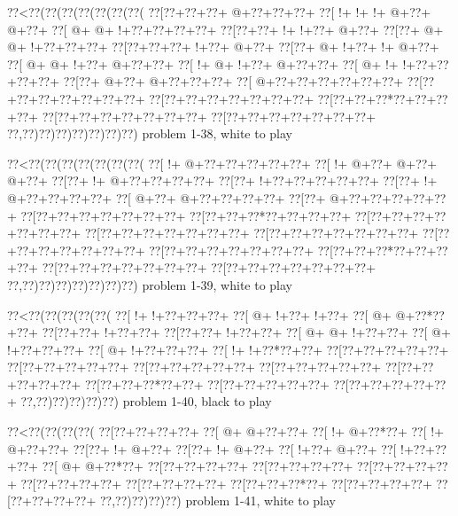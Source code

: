 \vbox{\vbox{\goo
\0??<\0??(\0??(\0??(\0??(\0??(\0??(\0??(
\0??[\0??+\0??+\0??+\- @+\0??+\0??+\0??+
\0??[\- !+\- !+\- !+\- @+\0??+\- @+\0??+
\0??[\- @+\- @+\- !+\0??+\0??+\0??+\0??+
\0??[\0??+\0??+\- !+\- !+\0??+\- @+\0??+
\0??[\0??+\- @+\- @+\- !+\0??+\0??+\0??+
\0??[\0??+\0??+\0??+\- !+\0??+\- @+\0??+
\0??[\0??+\- @+\- !+\0??+\- !+\- @+\0??+
\0??[\- @+\- @+\- !+\0??+\- @+\0??+\0??+
\0??[\- !+\- @+\- !+\0??+\- @+\0??+\0??+
\0??[\- @+\- !+\- !+\0??+\0??+\0??+\0??+
\0??[\0??+\- @+\0??+\- @+\0??+\0??+\0??+
\0??[\- @+\0??+\0??+\0??+\0??+\0??+\0??+
\0??[\0??+\0??+\0??+\0??+\0??+\0??+\0??+
\0??[\0??+\0??+\0??+\0??+\0??+\0??+\0??+
\0??[\0??+\0??+\0??*\0??+\0??+\0??+\0??+
\0??[\0??+\0??+\0??+\0??+\0??+\0??+\0??+
\0??[\0??+\0??+\0??+\0??+\0??+\0??+\0??+
\0??,\0??)\0??)\0??)\0??)\0??)\0??)\0??)
}
\hfil problem 1-38, white to play\hfil\break
}

\vbox{\vbox{\goo
\0??<\0??(\0??(\0??(\0??(\0??(\0??(\0??(
\0??[\- !+\- @+\0??+\0??+\0??+\0??+\0??+
\0??[\- !+\- @+\0??+\- @+\0??+\- @+\0??+
\0??[\0??+\- !+\- @+\0??+\0??+\0??+\0??+
\0??[\0??+\- !+\0??+\0??+\0??+\0??+\0??+
\0??[\0??+\- !+\- @+\0??+\0??+\0??+\0??+
\0??[\- @+\0??+\- @+\0??+\0??+\0??+\0??+
\0??[\0??+\- @+\0??+\0??+\0??+\0??+\0??+
\0??[\0??+\0??+\0??+\0??+\0??+\0??+\0??+
\0??[\0??+\0??+\0??*\0??+\0??+\0??+\0??+
\0??[\0??+\0??+\0??+\0??+\0??+\0??+\0??+
\0??[\0??+\0??+\0??+\0??+\0??+\0??+\0??+
\0??[\0??+\0??+\0??+\0??+\0??+\0??+\0??+
\0??[\0??+\0??+\0??+\0??+\0??+\0??+\0??+
\0??[\0??+\0??+\0??+\0??+\0??+\0??+\0??+
\0??[\0??+\0??+\0??*\0??+\0??+\0??+\0??+
\0??[\0??+\0??+\0??+\0??+\0??+\0??+\0??+
\0??[\0??+\0??+\0??+\0??+\0??+\0??+\0??+
\0??,\0??)\0??)\0??)\0??)\0??)\0??)\0??)
}
\hfil problem 1-39, white to play\hfil\break
}

\vbox{\vbox{\goo
\0??<\0??(\0??(\0??(\0??(\0??(
\0??[\- !+\- !+\0??+\0??+\0??+
\0??[\- @+\- !+\0??+\- !+\0??+
\0??[\- @+\- @+\0??*\0??+\0??+
\0??[\0??+\0??+\- !+\0??+\0??+
\0??[\0??+\0??+\- !+\0??+\0??+
\0??[\- @+\- @+\- !+\0??+\0??+
\0??[\- @+\- !+\0??+\0??+\0??+
\0??[\- @+\- !+\0??+\0??+\0??+
\0??[\- !+\- !+\0??*\0??+\0??+
\0??[\0??+\0??+\0??+\0??+\0??+
\0??[\0??+\0??+\0??+\0??+\0??+
\0??[\0??+\0??+\0??+\0??+\0??+
\0??[\0??+\0??+\0??+\0??+\0??+
\0??[\0??+\0??+\0??+\0??+\0??+
\0??[\0??+\0??+\0??*\0??+\0??+
\0??[\0??+\0??+\0??+\0??+\0??+
\0??[\0??+\0??+\0??+\0??+\0??+
\0??,\0??)\0??)\0??)\0??)\0??)
}
\hfil problem 1-40, black to play\hfil\break
}

\vbox{\vbox{\goo
\0??<\0??(\0??(\0??(\0??(
\0??[\0??+\0??+\0??+\0??+
\0??[\- @+\- @+\0??+\0??+
\0??[\- !+\- @+\0??*\0??+
\0??[\- !+\- @+\0??+\0??+
\0??[\0??+\- !+\- @+\0??+
\0??[\0??+\- !+\- @+\0??+
\0??[\- !+\0??+\- @+\0??+
\0??[\- !+\0??+\0??+\0??+
\0??[\- @+\- @+\0??*\0??+
\0??[\0??+\0??+\0??+\0??+
\0??[\0??+\0??+\0??+\0??+
\0??[\0??+\0??+\0??+\0??+
\0??[\0??+\0??+\0??+\0??+
\0??[\0??+\0??+\0??+\0??+
\0??[\0??+\0??+\0??*\0??+
\0??[\0??+\0??+\0??+\0??+
\0??[\0??+\0??+\0??+\0??+
\0??,\0??)\0??)\0??)\0??)
}
\hfil problem 1-41, white to play\hfil\break
}

